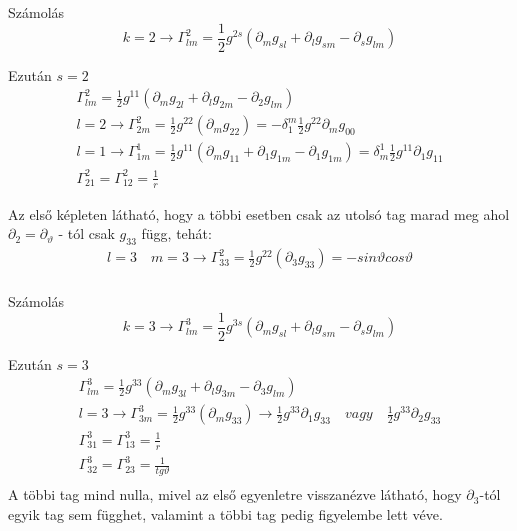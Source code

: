 \documentclass[10pt]{beamer}
\begin{document}
\begin{frame}[t]{Számolás}
$$k = 2 \rightarrow \Gamma_{lm}^{2} = \frac{1}{2}g^{2s}(\partial_{m}g_{sl} + \partial_{l}g_{sm} - \partial_{s}g_{lm})$$
\par Ezután $s = 2$ 
\begin{gather*}
\Gamma_{lm}^{2} = \frac{1}{2}g^{11}(\partial_{m}g_{2l} + \partial_{l}g_{2m} - \partial_{2}g_{lm}) \\
l = 2 \rightarrow \Gamma_{2m}^{2} = \frac{1}{2}g^{22}(\partial_{m}g_{22}) = 
-\delta_{1}^{m}\frac{1}{2}g^{22}\partial_{m}g_{00}\\
l = 1 \rightarrow \Gamma_{1m}^{1} = \frac{1}{2}g^{11}(\partial_{m}g_{11} + \partial_{1}g_{1m} - \partial_{1}g_{1m}) = \delta_{m}^{1}
\frac{1}{2}g^{11}\partial_{1}g_{11} \\
\Gamma_{21}^{2} = \Gamma_{12}^{2} = \frac{1}{r}
\end{gather*}
\par Az első képleten látható, hogy a többi esetben csak az utolsó tag marad meg ahol 
$\partial_{2} = \partial_{\vartheta}$ - tól csak $g_{33}$ függ, tehát:
\begin{gather*}
l = 3 \quad m = 3 \rightarrow \Gamma_{33}^{2} = \frac{1}{2}g^{22}(\partial_{3}g_{33}) = -sin\vartheta cos\vartheta \\
\end{gather*}
\end{frame}

\begin{frame}[t]{Számolás}
$$k = 3 \rightarrow \Gamma_{lm}^{3} = \frac{1}{2}g^{3s}(\partial_{m}g_{sl} + \partial_{l}g_{sm} - \partial_{s}g_{lm})$$
\par Ezután $s = 3$ 
\begin{gather*}
\Gamma_{lm}^{3} = \frac{1}{2}g^{33}(\partial_{m}g_{3l} + \partial_{l}g_{3m} - \partial_{3}g_{lm}) \\
l = 3 \rightarrow \Gamma_{3m}^{3} = \frac{1}{2}g^{33}(\partial_{m}g_{33}) \rightarrow 
\frac{1}{2}g^{33}\partial_{1}g_{33} \quad vagy \quad \frac{1}{2}g^{33}\partial_{2}g_{33}\\
\Gamma_{31}^{3} = \Gamma_{13}^{3} = \frac{1}{r} \\
\Gamma_{32}^{3} = \Gamma_{23}^{3} = \frac{1}{tg\vartheta} \\
\end{gather*}
A többi tag mind nulla, mivel az első egyenletre visszanézve látható, hogy $\partial_{3}$-tól egyik tag sem függhet, valamint
a többi tag pedig figyelembe lett véve.
\end{frame}
\end{document}
